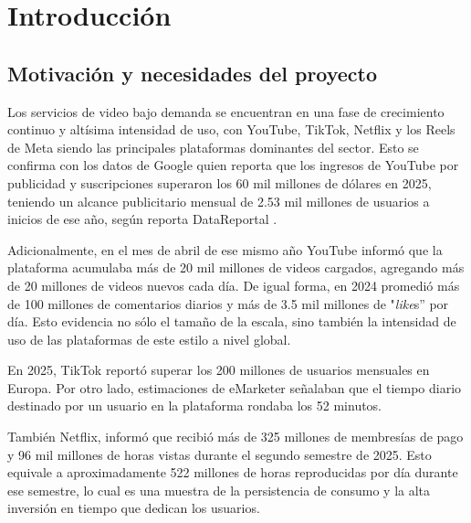 \chapter{Introducción}
\label{ch:intro}



\section{Motivación y necesidades del proyecto}

Los servicios de video bajo demanda se encuentran en una fase de crecimiento continuo y altísima intensidad de uso, con YouTube, TikTok, Netflix y los Reels de Meta siendo las principales plataformas dominantes del sector. Esto se confirma con los datos de Google \cite{alphabet2025results} quien reporta que los ingresos de YouTube por publicidad y suscripciones superaron los 60 mil millones de dólares en 2025, teniendo un alcance publicitario mensual de 2.53 mil millones de usuarios a inicios de ese año, según reporta DataReportal \cite{data-reportal}. 

Adicionalmente, en el mes de abril de ese mismo año YouTube informó que la plataforma acumulaba más de 20 mil millones de videos cargados, agregando más de 20 millones de videos nuevos cada día. De igual forma, en 2024 promedió más de 100 millones de comentarios diarios y más de 3.5 mil millones de  "\textit{like}s” por día. Esto evidencia no sólo el tamaño de la escala, sino también la intensidad de uso de las plataformas de este estilo a nivel global.  %

En 2025, TikTok \cite{tiktok_europe_200m} reportó superar los 200 millones de usuarios mensuales en Europa. Por otro lado, estimaciones de eMarketer señalaban que el tiempo diario destinado por un usuario en la plataforma rondaba los 52 minutos. %

También Netflix, informó \cite{netflix_q42025_shareholder} que recibió más de 325 millones de membresías de pago y 96 mil millones de horas vistas durante el segundo semestre de 2025. Esto equivale a aproximadamente 522 millones de horas reproducidas por día durante ese semestre, lo cual es una muestra de la persistencia de consumo y la alta inversión en tiempo que dedican los usuarios.  %


